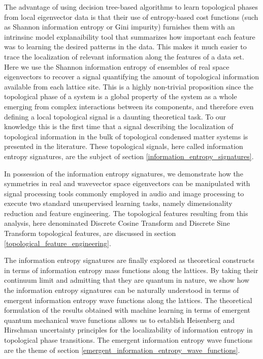 \documentclass[10pt]{revtex4-1}
\begin{document}
The advantage of using decision tree-based algorithms to learn topological phases from local eigenvector data is that their use of entropy-based cost functions (such as Shannon information entropy or Gini impurity) furnishes them with an intrinsinc model explanaibility tool that summarizes how important each feature was to learning the desired patterns in the data. This makes it much easier to trace the localization of relevant information along the features of a data set. Here we use the Shannon information entropy of ensembles of real space eigenvectors to recover a signal quantifying the amount of topological information available from each lattice site. This is a highly non-trivial proposition since the topological phase of a system is a global property of the system as a whole emerging from complex interactions between its components, and therefore even defining a local topological signal is a daunting theoretical task. To our knowledge this is the first time that a signal describing the localization of topological information in the bulk of topological condensed matter systems is presented in the literature. These topological signals, here called information entropy signatures, are the subject of section \ref{information_entropy_signatures}. 

In possession of the information entropy signatures, we demonstrate how the symmetries in real and wavevector space eigenvectors can be manipulated with signal processing tools commonly employed in audio and image processing to execute two standard unsupervised learning tasks, namely dimensionality reduction and feature engineering. The topological features resulting from this analysis, here denominated Discrete Cosine Transform and Discrete Sine Transform topological features, are discussed in section \ref{topological_feature_engineering}.    

The information entropy signatures are finally explored as theoretical constructs in terms of information entropy mass functions along the lattices. By taking their continuum limit and admitting that they are quantum in nature, we show how the information entropy signatures can be naturally understood in terms of emergent information entropy wave functions along the lattices. The theoretical formulation of the results obtained with machine learning in terms of emergent quantum mechanical wave functions allows us to establish Heisenberg and Hirschman uncertainty principles for the localizability of information entropy in topological phase transitions. The emergent information entropy wave functions are the theme of section \ref{emergent_information_entropy_wave_functions}.      
\end{document}
